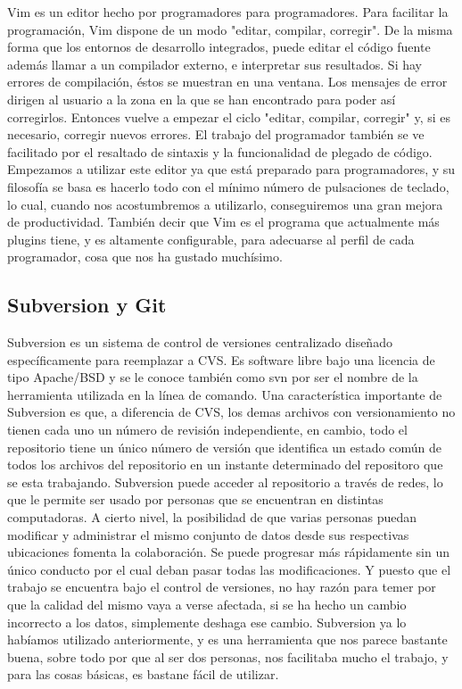 \documentclass[12pt,a4paper]{report}
\begin{document}
Vim es un editor hecho por programadores para programadores. Para facilitar la
programación, Vim dispone de un modo "editar, compilar, corregir". De la misma
forma que los entornos de desarrollo integrados, puede editar el código fuente
además llamar a un compilador externo, e interpretar sus resultados. Si hay
errores de compilación, éstos se muestran en una ventana. Los mensajes de error
dirigen al usuario a la zona en la que se han encontrado para poder así
corregirlos. Entonces vuelve a empezar el ciclo "editar, compilar, corregir" y,
si es necesario, corregir nuevos errores. El trabajo del programador también se
ve facilitado por el resaltado de sintaxis y la funcionalidad de plegado de
código. Empezamos a utilizar este editor ya que está preparado para
programadores, y su filosofía se basa es hacerlo todo con el mínimo número de
pulsaciones de teclado, lo cual, cuando nos acostumbremos a utilizarlo,
conseguiremos una gran mejora de productividad. También decir que Vim es el
programa que actualmente más plugins tiene, y es altamente configurable, para
adecuarse al perfil de cada programador, cosa que nos ha gustado muchísimo. 

\subsection{Subversion y Git}

Subversion es un sistema de control de versiones centralizado diseñado 
específicamente para reemplazar a CVS. Es software libre bajo una licencia de 
tipo Apache/BSD y se le conoce también como svn por ser el nombre de la 
herramienta utilizada en la línea de comando. 
Una característica importante de Subversion es que, a diferencia de CVS, los
demas archivos con versionamiento no tienen cada uno un número de revisión
independiente, en cambio, todo el repositorio tiene un único número de versión
que identifica un estado común de todos los archivos del repositorio en un
instante determinado del repositoro que se esta trabajando.
Subversion puede acceder al repositorio a través de redes, lo que le permite ser
usado por personas que se encuentran en distintas computadoras. A cierto nivel,
la posibilidad de que varias personas puedan modificar y administrar el mismo
conjunto de datos desde sus respectivas ubicaciones fomenta la colaboración. Se
puede progresar más rápidamente sin un único conducto por el cual deban pasar
todas las modificaciones. Y puesto que el trabajo se encuentra bajo el control
de versiones, no hay razón para temer por que la calidad del mismo vaya a verse
afectada, si se ha hecho un cambio incorrecto a los datos, simplemente deshaga
ese cambio. 
Subversion ya lo habíamos utilizado anteriormente, y es una herramienta que nos
parece bastante buena, sobre todo por que al ser dos personas, nos facilitaba
mucho el trabajo, y para las cosas básicas, es bastane fácil de utilizar. 
\end{document}
